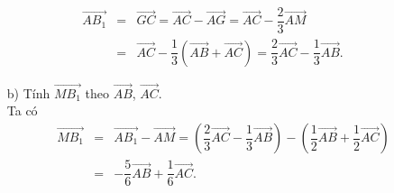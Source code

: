 \begin{vd}
{{\begin{tikzpicture}[scale=0.7, font=\footnotesize, line join=round, line cap=round, >=stealth]
			\end{tikzpicture}
		}
		\allowdisplaybreaks
		\begin{eqnarray*}
			\overrightarrow{AB_1}&= & \overrightarrow{GC} = \overrightarrow{AC} - \overrightarrow{AG} = \overrightarrow{AC} - \dfrac{2}{3}\overrightarrow{AM}\\
			&= & \overrightarrow{AC} - \dfrac{1}{3}\left(\overrightarrow{AB} + \overrightarrow{AC}\right) = \dfrac{2}{3}\overrightarrow{AC} - \dfrac{1}{3}\overrightarrow{AB}.
		\end{eqnarray*}
		\begin{enumerate}
			\item[b)] Tính $\overrightarrow{MB_1}$ theo $\overrightarrow{AB}$, $\overrightarrow{AC}$.\\
			      Ta có
			      \allowdisplaybreaks
			      \begin{eqnarray*}
				      \overrightarrow{MB_1}&= & \overrightarrow{AB_1} - \overrightarrow{AM} = \left(\dfrac{2}{3}\overrightarrow{AC} - \dfrac{1}{3}\overrightarrow{AB}\right) - \left(\dfrac{1}{2}\overrightarrow{AB} + \dfrac{1}{2}\overrightarrow{AC}\right)\\
				      &= & -\dfrac{5}{6}\overrightarrow{AB} + \dfrac{1}{6}\overrightarrow{AC}.
			      \end{eqnarray*}
		\end{enumerate}
	}
\end{vd}

